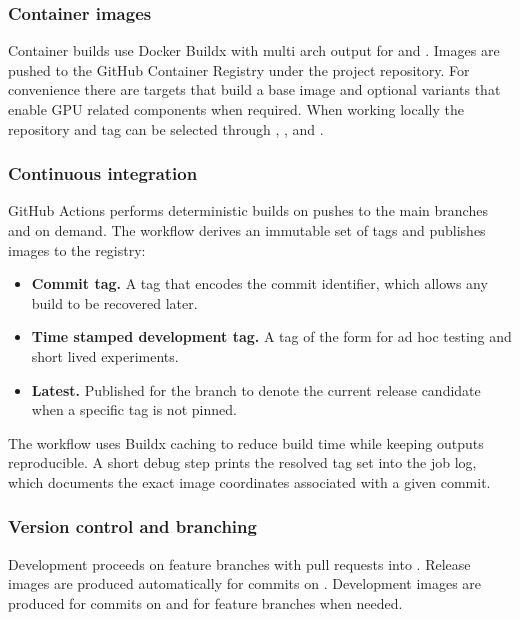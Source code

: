 \subsubsection{Container images}
\label{subsec:tycho_sysenv_build_images}
Container builds use Docker Buildx with multi arch output for  and . Images are pushed to the GitHub Container Registry under the project repository. For convenience there are targets that build a base image and optional variants that enable GPU related components when required. When working locally the repository and tag can be selected through , , and .

\subsubsection{Continuous integration}
\label{subsec:tycho_sysenv_build_ci}
GitHub Actions performs deterministic builds on pushes to the main branches and on demand. The workflow derives an immutable set of tags and publishes images to the registry:
\begin{itemize}
  \item \textbf{Commit tag.} A tag that encodes the commit identifier, which allows any build to be recovered later.
  \item \textbf{Time stamped development tag.} A tag of the form  for ad hoc testing and short lived experiments.
  \item \textbf{Latest.} Published for the  branch to denote the current release candidate when a specific tag is not pinned.
\end{itemize}
The workflow uses Buildx caching to reduce build time while keeping outputs reproducible. A short debug step prints the resolved tag set into the job log, which documents the exact image coordinates associated with a given commit.

\subsubsection{Version control and branching}
\label{subsec:tycho_sysenv_build_vcs}
Development proceeds on feature branches with pull requests into . Release images are produced automatically for commits on . Development images are produced for commits on  and for feature branches when needed.

